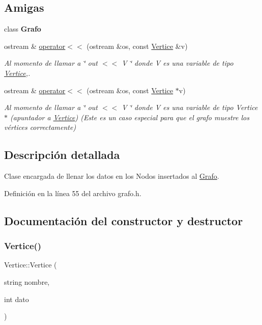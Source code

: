 \subsection*{Amigas}
\begin{DoxyCompactItemize}
\item 
\mbox{\label{classVertice_aa89bd7919924d99b99ffa9ab271175a3}} 
class {\bfseries Grafo}
\item 
ostream \& \hyperlink{classVertice_a3c70523eb9e12f80bb42762ac4708819}{operator$<$$<$} (ostream \&os, const \hyperlink{classVertice}{Vertice} \&v)
\begin{DoxyCompactList}\small\item\em Al momento de llamar a \char`\"{} out $<$$<$ V \char`\"{} donde V es una variable de tipo \hyperlink{classVertice}{Vertice},. \end{DoxyCompactList}\item 
ostream \& \hyperlink{classVertice_a11dd2c98c0d8abf3a52c680bc64ccc87}{operator$<$$<$} (ostream \&os, const \hyperlink{classVertice}{Vertice} $\ast$v)
\begin{DoxyCompactList}\small\item\em Al momento de llamar a \char`\"{} out $<$$<$ V \char`\"{} donde V es una variable de tipo Vertice$\ast$ (apuntador a \hyperlink{classVertice}{Vertice}) (Este es un caso especial para que el grafo muestre los vértices correctamente) \end{DoxyCompactList}\end{DoxyCompactItemize}


\subsection{Descripción detallada}
Clase encargada de llenar los datos en los Nodos insertados al \hyperlink{classGrafo}{Grafo}. 

Definición en la línea 55 del archivo grafo.\+h.



\subsection{Documentación del constructor y destructor}
\mbox{\label{classVertice_a7aff8f5bebd64a371708d72e12edc1dd}} 
\subsubsection{\texorpdfstring{Vertice()}{Vertice()}}
{\footnotesize\ttfamily Vertice\+::\+Vertice (\begin{DoxyParamCaption}\item[{string}]{nombre,  }\item[{int}]{dato }\end{DoxyParamCaption})\hspace{0.3cm}{\ttfamily [inline]}}



